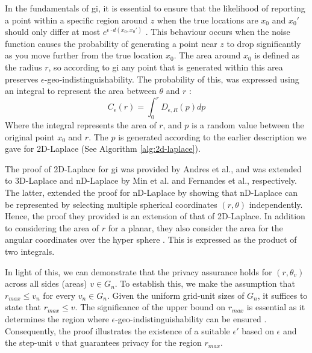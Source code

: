 In the fundamentals of \gls{gi}, it is essential to ensure that the likelihood of reporting a point within a specific region around $z$ when the true locations are $x_0$ and $x_0'$ should only differ at most $e^{\epsilon \cdot d(x_0, x_0')}$ \citep{DBLP:journals/corr/abs-1212-1984}. This behaviour occurs when the noise function causes the probability of generating a point near $z$ to drop significantly as you move further from the true location $x_0$.
The area around $x_0$ is defined as the radius $r$, so according to \gls{gi} any point that is generated within this area preserves $\epsilon$-geo-indistinguishability. The probability of this, was expressed using an integral to represent the area between $\theta$ and $r$ \citep{DBLP:journals/corr/abs-1212-1984}:
\begin{equation}
    C_\epsilon(r) = \int^{r}_0 D_{\epsilon, R}(p)dp
\end{equation}
Where the integral represents the area of $r$, and $p$ is a random value between the original point $x_0$ and $r$. The $p$ is generated according to the earlier description we gave for 2D-Laplace (See Algorithm \ref{alg:2d-laplace}).

The proof of 2D-Laplace for \gls{gi} was provided by Andres et al., and was extended to 3D-Laplace and nD-Laplace by Min et al. and Fernandes et al., respectively. 
The latter, extended the proof for nD-Laplace by showing that nD-Laplace can be represented by selecting multiple spherical coordinates $(r, \theta)$ independently. Hence, the proof they provided is an extension of that of 2D-Laplace. In addition to considering the area of $r$ for a planar, they also consider the area for the angular coordinates over the hyper sphere \citep{fernandes_generalised_2019}. This is expressed as the product of two integrals.\newline

In light of this, we can demonstrate that the privacy assurance holds for $(r, \theta_v)$ across all sides (areas) $v \in G_n$. 
To establish this, we make the assumption that $r_{max} \leq v_n$ for every $v_n \in G_n$. 
Given the uniform grid-unit sizes of $G_n$, it suffices to state that $r_{max} \leq v$. 
The significance of the upper bound on $r_{max}$ is essential as it determines the region where $\epsilon$-geo-indistinguishability can be ensured \citep{DBLP:journals/corr/abs-1212-1984}. Consequently, the proof illustrates the existence of a suitable $\epsilon'$ based on $\epsilon$ and the step-unit $v$ that guarantees privacy for the region $r_{max}$.

